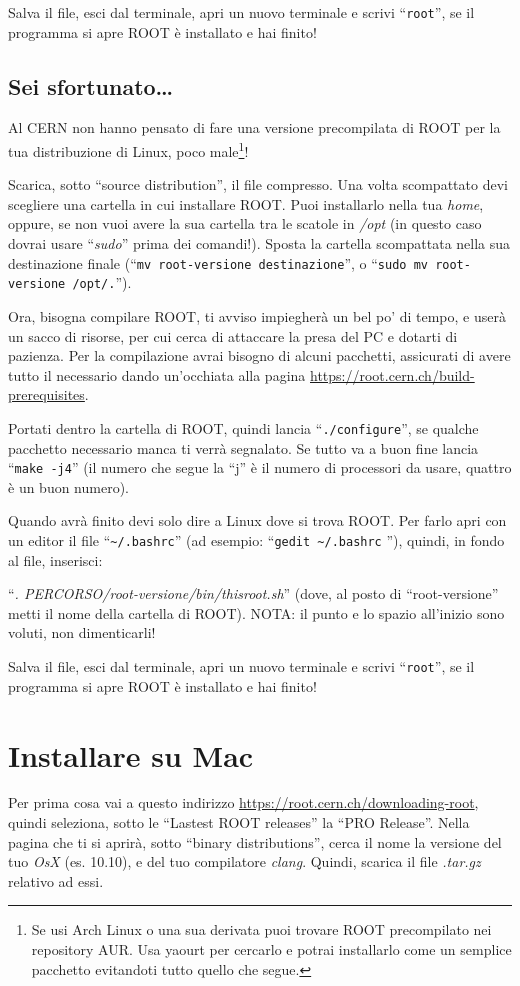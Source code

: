 Salva il file, esci dal terminale, apri un nuovo terminale e scrivi ``\verb|root|'', se il programma si apre ROOT è installato e hai finito!
\subsection{Sei sfortunato\ldots}\label{distronotfound}
Al CERN non hanno pensato di fare una versione precompilata di ROOT per la tua distribuzione di Linux, poco male\footnote{Se usi Arch Linux o una sua derivata puoi trovare ROOT precompilato nei repository AUR. Usa yaourt per cercarlo e potrai installarlo come un semplice pacchetto evitandoti tutto quello che segue.}! 

Scarica, sotto ``source distribution'', il file compresso. Una volta scompattato devi scegliere una cartella in cui installare ROOT. Puoi installarlo nella tua \emph{home}, oppure, se non vuoi avere la sua cartella tra le scatole in \emph{/opt} (in questo caso dovrai usare ``\emph{sudo}'' prima dei comandi!). Sposta la cartella scompattata nella sua destinazione finale (``\verb|mv root-versione destinazione|'', o ``\verb|sudo mv root-versione /opt/.|''). 

Ora, bisogna compilare ROOT, ti avviso impiegherà un bel po' di tempo, e userà un sacco di risorse, per cui cerca di attaccare la presa del PC e dotarti di pazienza. Per la compilazione avrai bisogno di alcuni pacchetti, assicurati di avere tutto il necessario dando un'occhiata alla pagina \url{https://root.cern.ch/build-prerequisites}. 

Portati dentro la cartella di ROOT, quindi lancia ``\verb|./configure|'', se qualche pacchetto necessario manca ti verrà segnalato. Se tutto va a buon fine lancia ``\verb|make -j4|'' (il numero che segue la ``j'' è il numero di processori da usare, quattro è un buon numero).

Quando avrà finito devi solo dire a Linux dove si trova ROOT. Per farlo apri con un editor il file ``\verb|~/.bashrc|'' (ad esempio: ``\verb|gedit ~/.bashrc| ''), quindi, in fondo al file, inserisci:

``\emph{. PERCORSO/root-versione/bin/thisroot.sh}'' (dove, al posto di ``root-versione'' metti il nome della cartella di ROOT). NOTA: il punto e lo spazio all'inizio sono voluti, non dimenticarli!

Salva il file, esci dal terminale, apri un nuovo terminale e scrivi ``\verb|root|'', se il programma si apre ROOT è installato e hai finito!
\section{Installare su Mac}\label{instmac}
Per prima cosa vai a questo indirizzo \url{https://root.cern.ch/downloading-root}, quindi seleziona, sotto le ``Lastest ROOT releases'' la ``PRO Release''. Nella pagina che ti si aprirà, sotto ``binary distributions'', cerca il nome la versione del tuo \emph{OsX} (es. 10.10), e del tuo compilatore \emph{clang}. Quindi, scarica il file \emph{.tar.gz} relativo ad essi. 

